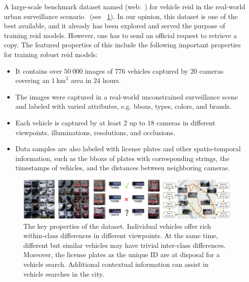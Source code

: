 A large-scale benchmark dataset named \verisss{} (web:~\cite{webveridataset}) for vehicle \gls{reid} in the real-world urban surveillance scenario~\cite{liu2018provid} (see \figstr{}~\ref{fig:VeRI776Dataset}). In our opinion, this dataset is one of the best available, and it already has been explored and served the purpose of training \gls{reid} models. However, one has to send an official request to retrieve a copy. The featured properties of this include the following important properties for training robust \gls{reid} models:

\begin{itemize}
    \item It contains over $50\ 000$ images of $776$ vehicles captured by $20$ cameras covering an $1\  \text{km}^2$ area in $24$ hours.
    \item The images were captured in a real-world unconstrained surveillance scene and labeled with varied attributes, e.g. \glspl{bbox}, types, colors, and brands.
    \item Each vehicle is captured by at least $2$ up to $18$ cameras in different viewpoints, illuminations, resolutions, and occlusions.
    \item Data samples are also labeled with license plates and other spatio-temporal information, such as the \glspl{bbox} of plates with corresponding strings, the timestamps of vehicles, and the distances between neighboring cameras.
\end{itemize}

\begin{figure}[t]
    \centerline{\includegraphics[width=\linewidth]{figures/datasets/veri776__overview.pdf}}
    \caption[\verisss{} dataset]{The key properties of the \verisss{} dataset. Individual vehicles offer rich within-class differences in different viewpoints. At the same time, different but similar vehicles may have trivial inter-class differences. Moreover, the license plates as the unique ID are at disposal for a vehicle search. Additional contextual information can assist in vehicle searches in the city. }
    \label{fig:VeRI776Dataset}
\end{figure}
